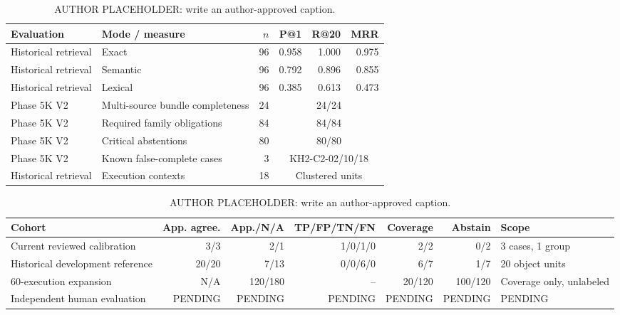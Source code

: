 
\begin{table}[t]
\centering
\small
\caption{AUTHOR PLACEHOLDER: write an author-approved caption.}
\label{tab:rq1}
\begin{tabular}{llrrrr}
\toprule
Evaluation & Mode / measure & $n$ & P@1 & R@20 & MRR \\
\midrule
Historical retrieval & Exact & 96 & 0.958 & 1.000 & 0.975 \\
Historical retrieval & Semantic & 96 & 0.792 & 0.896 & 0.855 \\
Historical retrieval & Lexical & 96 & 0.385 & 0.613 & 0.473 \\
\midrule
Phase 5K V2 & Multi-source bundle completeness & 24 & \multicolumn{3}{c}{24/24} \\
Phase 5K V2 & Required family obligations & 84 & \multicolumn{3}{c}{84/84} \\
Phase 5K V2 & Critical abstentions & 80 & \multicolumn{3}{c}{80/80} \\
Phase 5K V2 & Known false-complete cases & 3 & \multicolumn{3}{c}{KH2-C2-02/10/18} \\
Historical retrieval & Execution contexts & 18 & \multicolumn{3}{c}{Clustered units} \\
\bottomrule
\end{tabular}
\end{table}

\begin{table}[t]
\centering
\small
\caption{AUTHOR PLACEHOLDER: write an author-approved caption.}
\label{tab:rq2}
\begin{tabular}{lrrrrrl}
\toprule
Cohort & App. agree. & App./N/A & TP/FP/TN/FN & Coverage & Abstain & Scope \\
\midrule
Current reviewed calibration & 3/3 & 2/1 & 1/0/1/0 & 2/2 & 0/2 & 3 cases, 1 group \\
Historical development reference & 20/20 & 7/13 & 0/0/6/0 & 6/7 & 1/7 & 20 object units \\
60-execution expansion & N/A & 120/180 & -- & 20/120 & 100/120 & Coverage only, unlabeled \\
Independent human evaluation & PENDING & PENDING & PENDING & PENDING & PENDING & PENDING \\
\bottomrule
\end{tabular}
\end{table}

